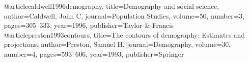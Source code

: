 @article{caldwell1996demography,
  title={Demography and social science},
  author={Caldwell, John C},
  journal={Population Studies},
  volume={50},
  number={3},
  pages={305--333},
  year={1996},
  publisher={Taylor \& Francis}
}
@article{preston1993contours,
  title={The contours of demography: Estimates and projections},
  author={Preston, Samuel H},
  journal={Demography},
  volume={30},
  number={4},
  pages={593--606},
  year={1993},
  publisher={Springer}
}